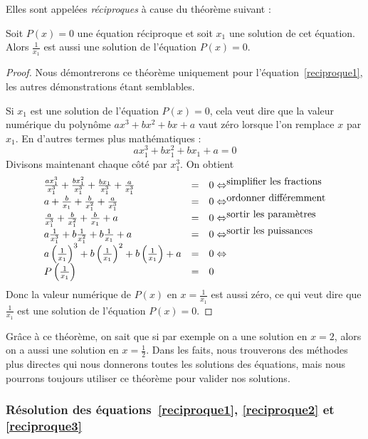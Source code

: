 Elles sont appelées \emph{réciproques} à cause du théorème suivant :
\begin{theoreme}
Soit $P(x) = 0$ une équation réciproque et soit $x_1$ une solution de cet équation. Alors $\frac{1}{x_1}$ est aussi une solution de l'équation $P(x) = 0$.
\end{theoreme}
\begin{proof}
Nous démontrerons ce théorème uniquement pour l'équation~\ref{reciproque1}, les autres démonstrations étant semblables.

Si $x_1$ est une solution de l'équation $P(x) = 0$, cela veut dire que la valeur numérique du polynôme $ax^3+ bx^2+ bx+ a$ vaut zéro lorsque l'on remplace $x$ par $x_1$. En d'autres termes plus mathématiques :
$$
ax_1^3+ bx_1^2+ bx_1+ a = 0
$$
Divisons maintenant chaque côté par $x_1^3$. On obtient 
$$
\begin{array}{lcl}
\frac{ax_1^3}{x_1^3} + \frac{bx_1^2 }{x_1^3} + \frac{bx_1}{x_1^3} + \frac{a}{x_1^3} &=& 0\Leftrightarrow^{\mbox{simplifier les fractions}} \\
a + \frac{b}{x_1} + \frac{b}{x_1^2} + \frac{a}{x_1^3} &=& 0\Leftrightarrow^{\mbox{ordonner différemment}}  \\
\frac{a}{x_1^3}+ \frac{b}{x_1^2}+ \frac{b}{x_1}+a&=& 0 \Leftrightarrow^{\mbox{sortir les paramètres}} \\
a\frac{1}{x_1^3}+ b\frac{1}{x_1^2}+ b\frac{1}{x_1}+a &=& 0 \Leftrightarrow^{\mbox{sortir les puissances}} \\
a\left(\frac{1}{x_1}\right)^3 + b\left(\frac{1}{x_1}\right)^2 + b \left(\frac{1}{x_1}\right) + a &=& 0\Leftrightarrow\\
P\left(\frac{1}{x_1}\right) &=& 0
\end{array}
$$
Donc la valeur numérique de $P(x)$ en $x=\frac{1}{x_1}$ est aussi zéro, ce qui veut dire que $\frac{1}{x_1}$ est une solution de l'équation $P(x) = 0$.
\end{proof}

Grâce à ce théorème, on sait que si par exemple on a une solution en $x=2$, alors on a aussi une solution en $x= \frac{1}{2}$. Dans les faits, nous trouverons des méthodes plus directes qui nous donnerons toutes les solutions des équations, mais nous pourrons toujours utiliser ce théorème pour valider nos solutions.

\subsubsection{Résolution des équations~\ref{reciproque1}, \ref{reciproque2} et \ref{reciproque3}}

